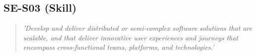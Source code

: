 \subsection{SE-S03 (Skill)}

  \begin{quote}
    \textit{'Develop and deliver distributed or semi-complex
    software solutions that are scalable, and that deliver
    innovative user experiences and journeys that encompass
    cross-functional teams, platforms, and technologies.'}
  \end{quote}

\newpage
